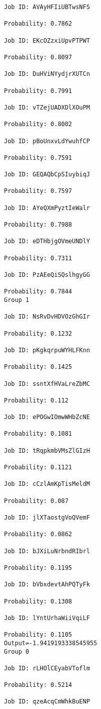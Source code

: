 \documentclass[11pt]{article}
\begin{document}
\begin{Verbatim}[commandchars=\\\{\}]
Job ID: AVAyHFIiUBTwsNFS

Probability: 0.7862

Job ID: EKcOZzxiUpvPTPWT

Probability: 0.8097

Job ID: DuHViNYydjrXUTCn

Probability: 0.7991

Job ID: vTZejUADXDlXOuPM

Probability: 0.8002

Job ID: pBoUnxvLdYwuhfCP

Probability: 0.7591

Job ID: GEQAQbCpSIuybiqJ

Probability: 0.7597

Job ID: AYeQXmPyztIeWalr

Probability: 0.7988

Job ID: eDTHbjgOVmeUNDlY

Probability: 0.7311

Job ID: PzAEeQiSQslhgyGG

Probability: 0.7844
Group 1

Job ID: NsRvDvHDVOzGhGIr

Probability: 0.1232

Job ID: pKgkqrpuWYHLFKnn

Probability: 0.1425

Job ID: ssntXfHVaLreZbMC

Probability: 0.112

Job ID: ePOGwIOmwWHbZcNE

Probability: 0.1081

Job ID: tRqpkmbVMsZlGIzH

Probability: 0.1121

Job ID: cCzlAmKpTisMeldM

Probability: 0.087

Job ID: jlXTaostgVoQVemF

Probability: 0.0862

Job ID: bJXiLuNrbndRIbrl

Probability: 0.1195

Job ID: bVbxdevtAhPQTyFk

Probability: 0.1308

Job ID: lYntUrhaWiiVqiLF

Probability: 0.1105
Output=-1.9419193338545955
Group 0

Job ID: rLHOlCEyabVToflm

Probability: 0.5214

Job ID: qzeAcqCmWhkBuENP


\end{Verbatim}
\end{document}

